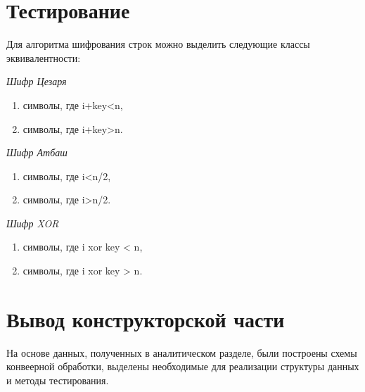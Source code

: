 \section{Тестирование}\label{Testing}

Для алгоритма шифрования строк можно выделить следующие классы эквивалентности:

\textit{Шифр Цезаря}

\begin{enumerate}
    \item символы, где i+key<n, 
    \item символы, где i+key>n.
\end{enumerate}

\textit{Шифр Атбаш}

\begin{enumerate}
    \item символы, где i<n/2, 
    \item символы, где i>n/2.
\end{enumerate}

\textit{Шифр XOR}

\begin{enumerate}
    \item символы, где i xor key < n, 
    \item символы, где i xor key > n.
\end{enumerate}




\section{Вывод конструкторской части}\label{KonstructResult}
На основе данных, полученных в аналитическом разделе, были построены схемы конвеерной обработки,
выделены необходимые для реализации структуры данных и методы тестирования.

